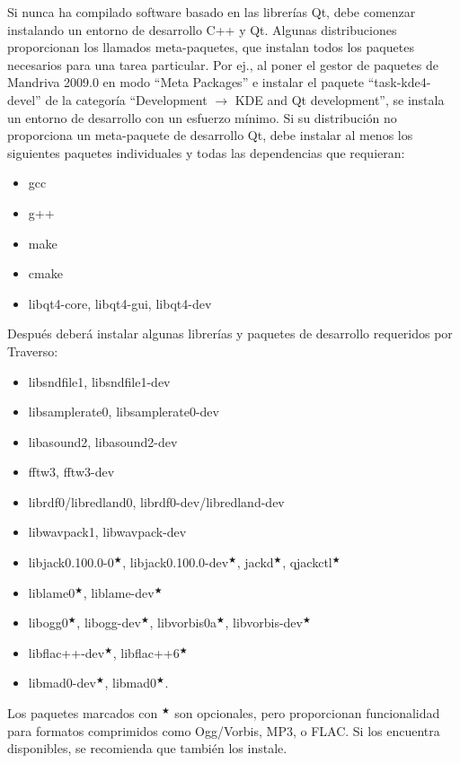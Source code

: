 Si nunca ha compilado software basado en las librerías Qt, debe comenzar instalando un entorno de desarrollo C++ y Qt. Algunas distribuciones proporcionan los llamados meta-paquetes, que instalan todos los paquetes necesarios para una tarea particular. Por ej., al poner el gestor de paquetes de Mandriva 2009.0 en modo ``Meta Packages'' e instalar el paquete ``task-kde4-devel'' de la categoría ``Development $\rightarrow$ KDE and Qt development'', se instala un entorno de desarrollo con un esfuerzo mínimo. Si su distribución no proporciona un meta-paquete de desarrollo Qt, debe instalar al menos los siguientes paquetes individuales y todas las dependencias que requieran:

\begin{itemize}
	\item gcc
	\item g++
	\item make
	\item cmake
	\item libqt4-core, libqt4-gui, libqt4-dev
\end{itemize}

Después deberá instalar algunas librerías y paquetes de desarrollo requeridos por Traverso:

\begin{itemize}
	\item libsndfile1, libsndfile1-dev
	\item libsamplerate0, libsamplerate0-dev
	\item libasound2, libasound2-dev
	\item fftw3, fftw3-dev
	\item librdf0/libredland0, librdf0-dev/libredland-dev
	\item libwavpack1, libwavpack-dev
	\item libjack0.100.0-0$^\bigstar$, libjack0.100.0-dev$^\bigstar$, jackd$^\bigstar$, qjackctl$^\bigstar$
	\item liblame0$^\bigstar$, liblame-dev$^\bigstar$
	\item libogg0$^\bigstar$, libogg-dev$^\bigstar$, libvorbis0a$^\bigstar$, libvorbis-dev$^\bigstar$
	\item libflac++-dev$^\bigstar$, libflac++6$^\bigstar$
	\item libmad0-dev$^\bigstar$, libmad0$^\bigstar$.
\end{itemize}

Los paquetes marcados con $^\bigstar$ son opcionales, pero proporcionan funcionalidad para formatos comprimidos como Ogg/Vorbis, MP3, o FLAC. Si los encuentra disponibles, se recomienda que también los instale.


